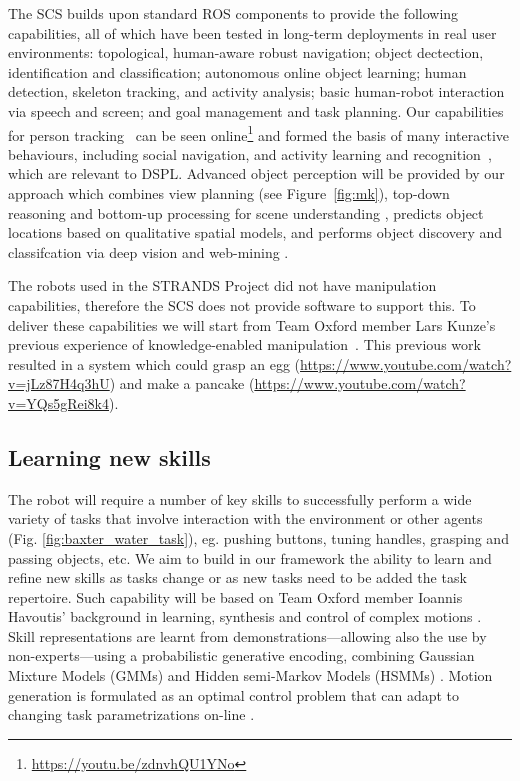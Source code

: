 \documentclass[runningheads,a4paper]{llncs}
\newcommand{\teamori}{Team Oxford}
\begin{document}
The SCS builds upon standard ROS components to provide the following capabilities, all of which have been tested in long-term deployments in real user environments: topological, human-aware robust navigation; object dectection, identification and classification; autonomous online object learning; human detection, skeleton tracking, and activity analysis; basic human-robot interaction via speech and screen; and goal management and task planning. Our capabilities for person tracking~\cite{dondrup2015tracker} can be seen online\footnote{\url{https://youtu.be/zdnvhQU1YNo}} and formed the basis of many interactive behaviours, including social navigation, and activity learning and recognition~\cite{duckworth_aamas2016}, which are relevant to DSPL. Advanced object perception will be provided by our approach which combines view planning (see Figure~\ref{fig:mk}), top-down reasoning and bottom-up processing for scene understanding \cite{kunze14topdown}, predicts object locations based on qualitative spatial models\cite{kunze14bootstrapping}, and performs object discovery and classifcation via deep vision and web-mining \cite{aloof@icra17}.

The robots used in the STRANDS Project did not have manipulation capabilities, therefore the SCS does not provide software to support this. To deliver these capabilities we will start from \teamori{} member Lars Kunze's previous experience of knowledge-enabled manipulation~\cite{kunze15aij}. This previous work resulted in a system which could grasp an egg (\url{https://www.youtube.com/watch?v=jLz87H4q3hU}) and make a pancake (\url{https://www.youtube.com/watch?v=YQs5gRei8k4}).

\subsection{Learning new skills}
The robot will require a number of key skills to successfully perform a wide
variety of tasks that involve interaction with the environment or other
agents (Fig. \ref{fig:baxter_water_task}), eg. pushing buttons, tuning handles, grasping and passing objects, etc. %
We aim to build in our framework the ability
to learn and refine new skills as tasks change or as new tasks need to be added
the task repertoire. Such capability will be based on \teamori{} 
member Ioannis Havoutis' background in learning, synthesis and control of 
complex motions \cite{Havoutis16SSRR}. Skill representations
are learnt from demonstrations---allowing also the use by non-experts---using a probabilistic generative encoding, combining Gaussian 
Mixture Models (GMMs) and Hidden semi-Markov Models (HSMMs)
\cite{Havoutis17ICRA}. Motion generation is formulated as an optimal control
problem that can adapt to changing task parametrizations on-line \cite{Zeestraten17IROS,Zeestraten2017-RAL}.
\end{document}
